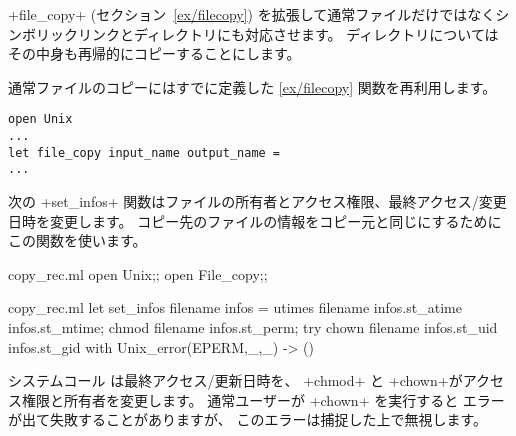 \ml+file_copy+ (セクション~\ref{ex/filecopy}) を拡張して通常ファイルだけではなくシンボリックリンクとディレクトリにも対応させます。
ディレクトリについてはその中身も再帰的にコピーすることにします。

通常ファイルのコピーにはすでに定義した \ref{ex/filecopy} 関数を再利用します。
\begin{lstlisting}
open Unix
...
let file_copy input_name output_name =
...
\end{lstlisting}
次の \ml+set_infos+ 関数はファイルの所有者とアクセス権限、最終アクセス/変更日時を変更します。
コピー先のファイルの情報をコピー元と同じにするためにこの関数を使います。
%
\begin{codefile}{copy_rec.ml}
open Unix;;
open File_copy;;
\end{codefile}
%
\begin{listingcodefile}{copy_rec.ml}
let set_infos filename infos =
  utimes filename infos.st_atime infos.st_mtime;
  chmod filename infos.st_perm;
  try
    chown filename infos.st_uid infos.st_gid
  with Unix_error(EPERM,_,_) -> ()
\end{listingcodefile}
%
システムコール  は最終アクセス/更新日時を、
\ml+chmod+ と \ml+chown+がアクセス権限と所有者を変更します。
通常ユーザーが \ml+chown+ を実行すると  エラーが出て失敗することがありますが、
このエラーは捕捉した上で無視します。

